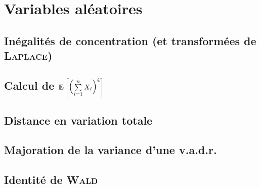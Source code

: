 \chapter{Variables aléatoires}

\section{Inégalités de concentration (et transformées de \textsc{Laplace})}


\section{Calcul de \texorpdfstring{$\mathbf{E} \left [ \left (\sum\limits_{i=1}^{n} X_i \right)^4 \right]$}{espérance de la somme puissance 4 de v.a.}}


\section{Distance en variation totale}


\section{Majoration de la variance d'une v.a.d.r.}


\section{Identité de \textsc{Wald}}

